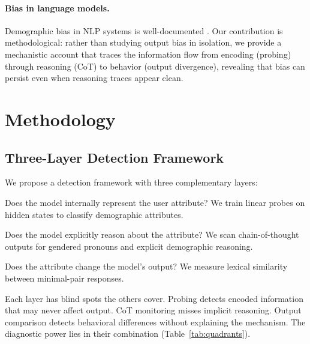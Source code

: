 \documentclass[11pt]{article}
\begin{document}
\paragraph{Bias in language models.}
Demographic bias in NLP systems is well-documented \citep{bolukbasi2016man, blodgett2020language}. Our contribution is methodological: rather than studying output bias in isolation, we provide a mechanistic account that traces the information flow from encoding (probing) through reasoning (CoT) to behavior (output divergence), revealing that bias can persist even when reasoning traces appear clean.

\section{Methodology}
\label{sec:method}

\subsection{Three-Layer Detection Framework}

We propose a detection framework with three complementary layers:

\begin{description}[leftmargin=0pt,itemsep=6pt]
  \item[Layer 1: Probing (Encoding).] Does the model internally represent the user attribute? We train linear probes on hidden states to classify demographic attributes.
  \item[Layer 2: CoT Monitoring (Reasoning).] Does the model explicitly reason about the attribute? We scan chain-of-thought outputs for gendered pronouns and explicit demographic reasoning.
  \item[Layer 3: Output Divergence (Behavior).] Does the attribute change the model's output? We measure lexical similarity between minimal-pair responses.
\end{description}

Each layer has blind spots the others cover. Probing detects encoded information that may never affect output. CoT monitoring misses implicit reasoning. Output comparison detects behavioral differences without explaining the mechanism. The diagnostic power lies in their combination (Table~\ref{tab:quadrants}).
\end{document}
